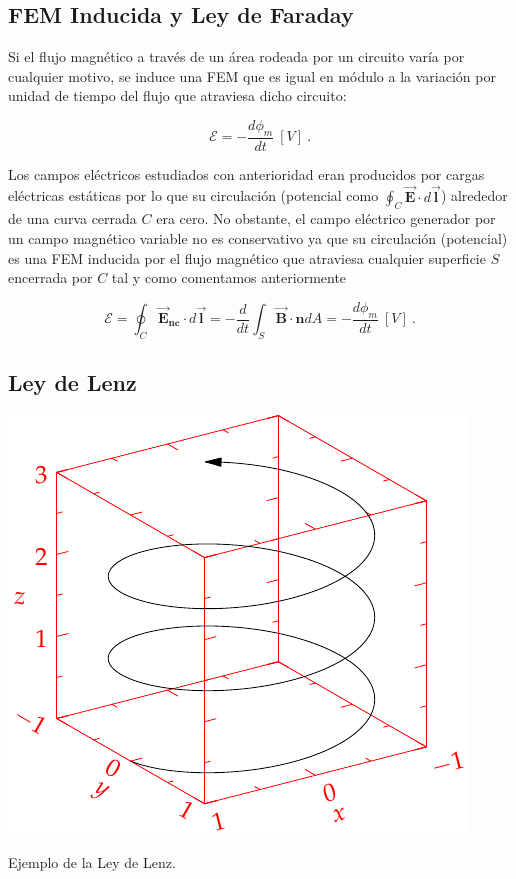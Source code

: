 \documentclass{tufte-handout}
\begin{document}
\subsection{FEM Inducida y Ley de Faraday}

Si el flujo magnético a través de un área rodeada por un circuito varía por cualquier motivo, se induce una FEM que es igual en módulo a la variación por unidad de tiempo del flujo que atraviesa dicho circuito:

\begin{equation}
\mathcal{E} = -\displaystyle\frac{d\phi_m}{dt}~[V]~.
\end{equation}

Los campos eléctricos estudiados con anterioridad eran producidos por cargas eléctricas estáticas por lo que su circulación (potencial como $\oint_{C}\mathbf{\vec{E}}\cdot d\mathbf{\vec{l}}$) alrededor de una curva cerrada $C$ era cero. No obstante, el campo eléctrico generador por un campo magnético variable no es conservativo ya que su circulación (potencial) es una FEM inducida por el flujo magnético que atraviesa cualquier superficie $S$ encerrada por $C$ tal y como comentamos anteriormente

\begin{equation}
\mathcal{E} = \oint_{C}\mathbf{\vec{E}_{nc}}\cdot d \mathbf{\vec{l}} = -\displaystyle\frac{d}{dt}\int_{S}\mathbf{\vec{B}}\cdot\mathbf{\hat{n}}dA = -\displaystyle\frac{d\phi_m}{dt}~[V]~.
\end{equation}

\subsection{Ley de Lenz}

\begin{marginfigure}%
    \includegraphics[width=\linewidth]{helix}
    \caption{Ejemplo de la Ley de Lenz.}
    \label{fig:ejemplolenz}
\end{marginfigure}
\end{document}
